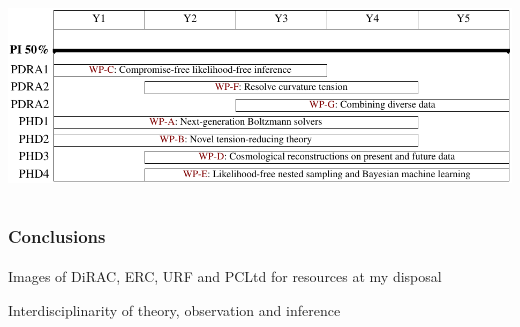 \documentclass[aspectratio=169, handout]{beamer}
\begin{document}
\begin{frame}
\begin{columns}
        \includegraphics[width=\textwidth]{figures/gantt.pdf}
    \end{columns}

\end{frame}

\begin{frame}
    \frametitle{Conclusions}
    \framesubtitle{}
    Images of DiRAC, ERC, URF and PCLtd for resources at my disposal

    Interdisciplinarity of theory, observation and inference


\end{frame}
\end{document}
